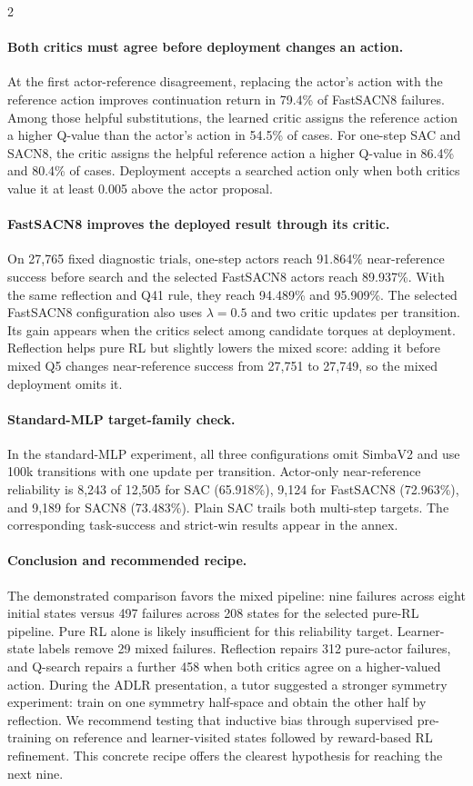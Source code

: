 \begin{multicols}{2}
\paragraph{Both critics must agree before deployment changes an action.}
At the first actor-reference disagreement, replacing the actor's action with the reference action improves continuation return in 79.4\% of FastSACN8 failures. Among those helpful substitutions, the learned critic assigns the reference action a higher Q-value than the actor's action in 54.5\% of cases. For one-step SAC and SACN8, the critic assigns the helpful reference action a higher Q-value in 86.4\% and 80.4\% of cases. Deployment accepts a searched action only when both critics value it at least 0.005 above the actor proposal.

\paragraph{FastSACN8 improves the deployed result through its critic.}
On 27,765 fixed diagnostic trials, one-step actors reach 91.864\% near-reference success before search and the selected FastSACN8 actors reach 89.937\%. With the same reflection and Q41 rule, they reach 94.489\% and 95.909\%. The selected FastSACN8 configuration also uses $\lambda=0.5$ and two critic updates per transition. Its gain appears when the critics select among candidate torques at deployment. Reflection helps pure RL but slightly lowers the mixed score: adding it before mixed Q5 changes near-reference success from 27,751 to 27,749, so the mixed deployment omits it.

\paragraph{Standard-MLP target-family check.}
In the standard-MLP experiment, all three configurations omit SimbaV2 and use 100k transitions with one update per transition. Actor-only near-reference reliability is 8,243 of 12,505 for SAC (65.918\%), 9,124 for FastSACN8 (72.963\%), and 9,189 for SACN8 (73.483\%). Plain SAC trails both multi-step targets. The corresponding task-success and strict-win results appear in the annex.

\paragraph{Conclusion and recommended recipe.}
The demonstrated comparison favors the mixed pipeline: nine failures across eight initial states versus 497 failures across 208 states for the selected pure-RL pipeline. Pure RL alone is likely insufficient for this reliability target. Learner-state labels remove 29 mixed failures. Reflection repairs 312 pure-actor failures, and Q-search repairs a further 458 when both critics agree on a higher-valued action. During the ADLR presentation, a tutor suggested a stronger symmetry experiment: train on one symmetry half-space and obtain the other half by reflection. We recommend testing that inductive bias through supervised pre-training on reference and learner-visited states followed by reward-based RL refinement. This concrete recipe offers the clearest hypothesis for reaching the next nine.


\end{multicols}
